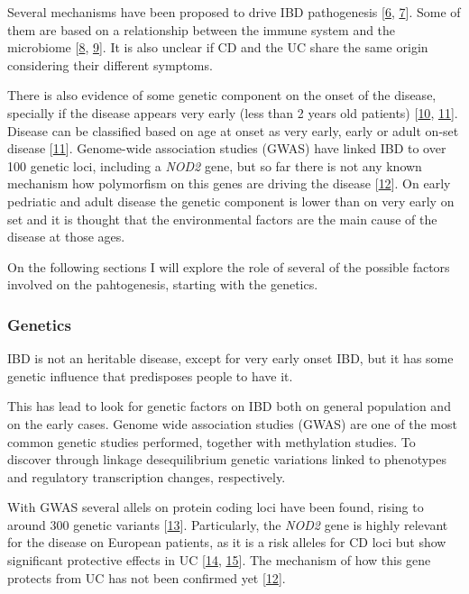 \documentclass[
  a4paper,
]{book}
\begin{document}
Several mechanisms have been proposed to drive IBD pathogenesis {[}\protect\hyperlink{ref-zhang2014}{6}, \protect\hyperlink{ref-hugot2004}{7}{]}.
Some of them are based on a relationship between the immune system and the microbiome {[}\protect\hyperlink{ref-silva2016}{8}, \protect\hyperlink{ref-demattos2015}{9}{]}.
It is also unclear if CD and the UC share the same origin considering their different symptoms.

There is also evidence of some genetic component on the onset of the disease, specially if the disease appears very early (less than 2 years old patients) {[}\protect\hyperlink{ref-mcgovern2015}{10}, \protect\hyperlink{ref-satsangi2006}{11}{]}.
Disease can be classified based on age at onset as very early, early or adult on-set disease {[}\protect\hyperlink{ref-satsangi2006}{11}{]}.
Genome-wide association studies (GWAS) have linked IBD to over 100 genetic loci, including a \emph{NOD2} gene, but so far there is not any known mechanism how polymorfism on this genes are driving the disease {[}\protect\hyperlink{ref-horowitz2021}{12}{]}.
On early pedriatic and adult disease the genetic component is lower than on very early on set and it is thought that the environmental factors are the main cause of the disease at those ages.

On the following sections I will explore the role of several of the possible factors involved on the pahtogenesis, starting with the genetics.

\hypertarget{genetics}{%
\subsubsection{Genetics}\label{genetics}}

IBD is not an heritable disease, except for very early onset IBD, but it has some genetic influence that predisposes people to have it.

This has lead to look for genetic factors on IBD both on general population and on the early cases.
Genome wide association studies (GWAS) are one of the most common genetic studies performed, together with methylation studies.
To discover through linkage desequilibrium genetic variations linked to phenotypes and regulatory transcription changes, respectively.

With GWAS several allels on protein coding loci have been found, rising to around 300 genetic variants {[}\protect\hyperlink{ref-kumar2019}{13}{]}.
Particularly, the \emph{NOD2} gene is highly relevant for the disease on European patients, as it is a risk alleles for CD loci but show significant protective effects in UC {[}\protect\hyperlink{ref-jostins2012}{14}, \protect\hyperlink{ref-momozawa2018}{15}{]}.
The mechanism of how this gene protects from UC has not been confirmed yet {[}\protect\hyperlink{ref-horowitz2021}{12}{]}.
\end{document}
